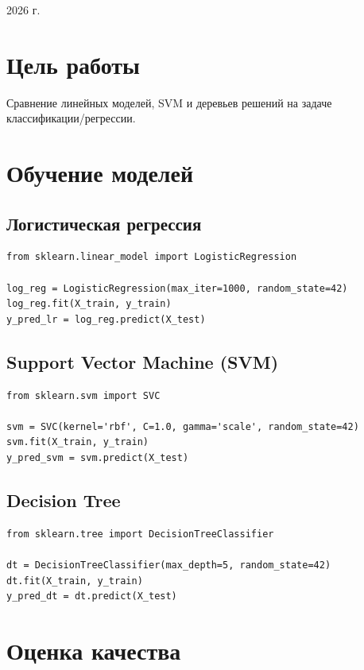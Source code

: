 \documentclass[a4paper,12pt]{article}
\begin{document}
\vfill
\begin{center}
    \large 2026 г.
\end{center}

\newpage

\pagestyle{plain}

\section*{Цель работы}
Сравнение линейных моделей, SVM и деревьев решений на задаче классификации/регрессии.

\section*{Обучение моделей}

\subsection*{Логистическая регрессия}
\begin{lstlisting}
from sklearn.linear_model import LogisticRegression

log_reg = LogisticRegression(max_iter=1000, random_state=42)
log_reg.fit(X_train, y_train)
y_pred_lr = log_reg.predict(X_test)
\end{lstlisting}

\subsection*{Support Vector Machine (SVM)}
\begin{lstlisting}
from sklearn.svm import SVC

svm = SVC(kernel='rbf', C=1.0, gamma='scale', random_state=42)
svm.fit(X_train, y_train)
y_pred_svm = svm.predict(X_test)
\end{lstlisting}

\subsection*{Decision Tree}
\begin{lstlisting}
from sklearn.tree import DecisionTreeClassifier

dt = DecisionTreeClassifier(max_depth=5, random_state=42)
dt.fit(X_train, y_train)
y_pred_dt = dt.predict(X_test)
\end{lstlisting}

\section*{Оценка качества}
\end{document}
